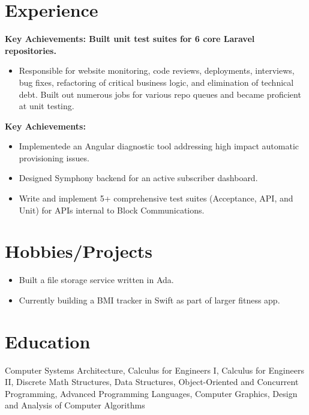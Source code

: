 \documentclass[10pt,a4paper]{moderncv}
\begin{document}
\section{Experience}
{\textbf{Key Achievements: Built unit test suites for 6 core Laravel repositories.}
\begin{itemize}
\item {Responsible for website monitoring, code reviews, deployments, interviews, bug fixes, refactoring of critical business logic, and elimination of technical debt. Built out numerous jobs for various repo queues and became proficient at unit testing.}
\end{itemize}}
{\textbf{Key Achievements:}
\begin{itemize}
\item {Implementede an Angular diagnostic tool addressing high impact automatic provisioning issues.}
\end{itemize}
\begin{itemize}
\item {Designed Symphony backend for an active subscriber dashboard.}
\end{itemize}
\begin{itemize}
\item{Write and implement 5+ comprehensive test suites (Acceptance, API, and Unit) for APIs internal to Block Communications.}
\end{itemize}}
\section{Hobbies/Projects}
\begin{itemize}
\item{Built a file storage service written in Ada.}
\end{itemize}
\begin{itemize}
\item{ Currently building a BMI tracker in Swift as part of larger fitness app.}
\end{itemize}
\section{Education}
Computer Systems Architecture, Calculus for Engineers I, Calculus for Engineers II, Discrete Math Structures, Data Structures,
Object-Oriented and Concurrent Programming, Advanced Programming Languages, Computer Graphics, Design and Analysis of Computer Algorithms
\end{document}
